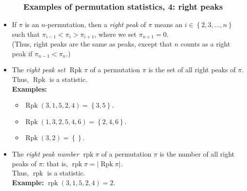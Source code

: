 \documentclass{beamer}
\newcommand{\Rpk}{\operatorname{Rpk}}
\newcommand{\rpk}{\operatorname{rpk}}
\newcommand{\fti}[1]{\frametitle{\ \ \ \ \ #1}}
\newcommand{\set}[1]{\left\{ #1 \right\}}
\newcommand{\abs}[1]{\left| #1 \right|}
\newcommand{\tup}[1]{\left( #1 \right)}
\newcommand{\defn}[1]{{\color{darkred}\emph{#1}}} %
\theoremstyle{plain}
\begin{document}
\begin{frame}
\fti{Examples of permutation statistics, 4: right peaks}

\begin{itemize}

\item If $\pi$ is an $n$-permutation, then a \defn{right peak} of $\pi$
      means an $i \in \set{2, 3, \ldots, n}$ such that
      $\pi_{i-1} < \pi_i > \pi_{i+1}$, where we set \defn{$\pi_{n+1} = 0$}. \\
      (Thus, right peaks are the same as peaks, except that $n$ counts
      as a right peak if $\pi_{n-1} < \pi_n$.)

\item The \defn{right peak set $\Rpk \pi$} of a permutation $\pi$ is
      the set of all right peaks of $\pi$. \\
      Thus, \defn{$\Rpk$} is a statistic. \\
      \textbf{Examples:}
      \begin{itemize}
      \item $\Rpk \tup{3, 1, 5, 2, 4} = \set{3, 5}$.
      \item $\Rpk \tup{1, 3, 2, 5, 4, 6} = \set{2, 4, 6}$.
      \item $\Rpk \tup{3, 2} = \set{}$.
      \end{itemize}

\item The \defn{right peak number $\rpk \pi$} of a permutation $\pi$
      is the number of all right peaks of $\pi$: that is,
      $\rpk \pi = \abs{\Rpk \pi}$. \\
      Thus, \defn{$\rpk$} is a statistic. \\
      \textbf{Example:} $\rpk \tup{3, 1, 5, 2, 4} = 2$.

\end{itemize}
\vspace{10cm}
\end{frame}
\end{document}
